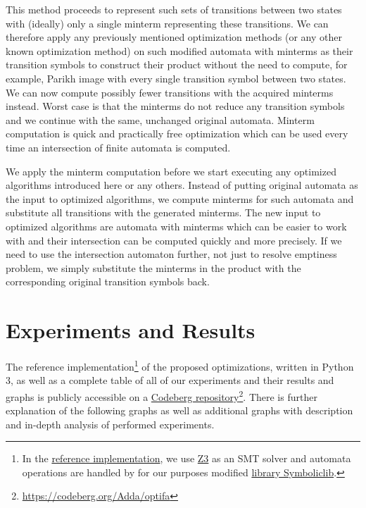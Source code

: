 This method proceeds to represent such sets of transitions between two states with (ideally) only a single minterm representing these transitions. We can therefore apply any previously mentioned optimization methods (or any other known optimization method) on such modified automata with minterms as their transition symbols to construct their product without the need to compute, for example, Parikh image with every single transition symbol between two states. We can now compute possibly fewer transitions with the acquired minterms instead. Worst case is that the minterms do not reduce any transition symbols and we continue with the same, unchanged original automata. Minterm computation is quick and practically free optimization which can be used every time an intersection of finite automata is computed.

We apply the minterm computation before we start executing any optimized algorithms introduced here or any others. Instead of putting original automata as the input to optimized algorithms, we compute minterms for such automata and substitute all transitions with the generated minterms. The new input to optimized algorithms are automata with minterms which can be easier to work with and their intersection can be computed quickly and more precisely. If we need to use the intersection automaton further, not just to resolve emptiness problem, we simply substitute the minterms in the product with the corresponding original transition symbols back.

\chapter{Experiments and Results}\label{experimentsAndResultsChapter}

The reference implementation\footnote{In the \href{https://codeberg.org/Adda/optifa}{reference implementation}, we use \href{https://github.com/Z3Prover/z3}{Z3} as an SMT solver and automata operations are handled by for our purposes modified \href{https://codeberg.org/Adda/symboliclib}{library Symboliclib}.} of the proposed optimizations, written in Python 3, as well as a complete table of all of our experiments and their results and graphs is publicly accessible on a \href{https://codeberg.org/Adda/optifa}{Codeberg repository}\footnote{\url{https://codeberg.org/Adda/optifa}}. There is further explanation of the following graphs as well as additional graphs with description and in-depth analysis of performed experiments.

